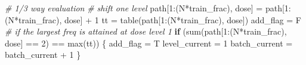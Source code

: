 \documentclass[
]{article}
\newenvironment{Shaded}{\begin{snugshade}}{\end{snugshade}}
\newcommand{\CommentTok}[1]{\textcolor[rgb]{0.56,0.35,0.01}{\textit{#1}}}
\newcommand{\ControlFlowTok}[1]{\textcolor[rgb]{0.13,0.29,0.53}{\textbf{#1}}}
\newcommand{\DecValTok}[1]{\textcolor[rgb]{0.00,0.00,0.81}{#1}}
\newcommand{\FunctionTok}[1]{\textcolor[rgb]{0.00,0.00,0.00}{#1}}
\newcommand{\NormalTok}[1]{#1}
\newcommand{\OtherTok}[1]{\textcolor[rgb]{0.56,0.35,0.01}{#1}}
\newcommand{\SpecialCharTok}[1]{\textcolor[rgb]{0.00,0.00,0.00}{#1}}
\newcommand{\StringTok}[1]{\textcolor[rgb]{0.31,0.60,0.02}{#1}}
\begin{document}
\begin{Shaded}
\begin{Highlighting}[]
\CommentTok{\# 1/3 way evaluation}
\CommentTok{\# shift one level}
\NormalTok{path[}\DecValTok{1}\SpecialCharTok{:}\NormalTok{(N}\SpecialCharTok{*}\NormalTok{train\_frac), }\StringTok{\textquotesingle{}dose\textquotesingle{}}\NormalTok{] }\OtherTok{=}\NormalTok{ path[}\DecValTok{1}\SpecialCharTok{:}\NormalTok{(N}\SpecialCharTok{*}\NormalTok{train\_frac), }\StringTok{\textquotesingle{}dose\textquotesingle{}}\NormalTok{] }\SpecialCharTok{+} \DecValTok{1}
\NormalTok{tt }\OtherTok{=} \FunctionTok{table}\NormalTok{(path[}\DecValTok{1}\SpecialCharTok{:}\NormalTok{(N}\SpecialCharTok{*}\NormalTok{train\_frac), }\StringTok{\textquotesingle{}dose\textquotesingle{}}\NormalTok{])}
\NormalTok{add\_flag }\OtherTok{=}\NormalTok{ F}
\CommentTok{\# if the largest freq is attained at dose level 1}
\ControlFlowTok{if}\NormalTok{ (}\FunctionTok{sum}\NormalTok{(path[}\DecValTok{1}\SpecialCharTok{:}\NormalTok{(N}\SpecialCharTok{*}\NormalTok{train\_frac), }\StringTok{\textquotesingle{}dose\textquotesingle{}}\NormalTok{] }\SpecialCharTok{==} \DecValTok{2}\NormalTok{) }\SpecialCharTok{==} \FunctionTok{max}\NormalTok{(tt)) \{}
\NormalTok{add\_flag }\OtherTok{=}\NormalTok{ T}
\NormalTok{level\_current }\OtherTok{=} \DecValTok{1}
\NormalTok{batch\_current }\OtherTok{=}\NormalTok{ batch\_current }\SpecialCharTok{+} \DecValTok{1}
\NormalTok{\} }


\end{Highlighting}
\end{Shaded}
\end{document}
